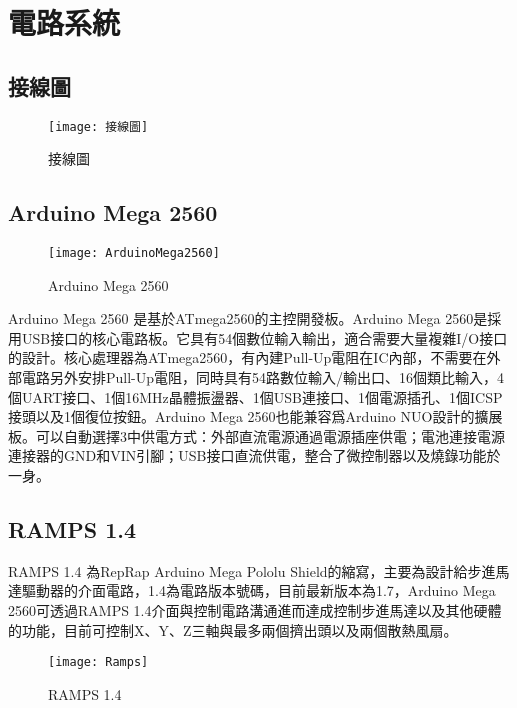 \chapter{電路系統}

\section{接線圖}

\begin{figure}[hbt!]
\begin{center}
\texttt{[image: 接線圖]}
\caption{\Large 接線圖}\label{接線圖}
\end{center}
\end{figure}

\section{Arduino Mega 2560}
\begin{figure}[hbt!]
\begin{center}
\texttt{[image: ArduinoMega2560]}
\caption{\Large Arduino Mega 2560}\label{ArduinoMega2560}
\end{center}
\end{figure}
 Arduino Mega 2560 是基於ATmega2560的主控開發板。Arduino Mega 2560是採用USB接口的核心電路板。它具有54個數位輸入輸出，適合需要大量複雜I/O接口的設計。核心處理器為ATmega2560，有內建Pull-Up電阻在IC內部，不需要在外部電路另外安排Pull-Up電阻，同時具有54路數位輸入/輸出口、16個類比輸入，4個UART接口、1個16MHz晶體振盪器、1個USB連接口、1個電源插孔、1個ICSP接頭以及1個復位按鈕。Arduino Mega 2560也能兼容爲Arduino NUO設計的擴展板。可以自動選擇3中供電方式：外部直流電源通過電源插座供電；電池連接電源連接器的GND和VIN引腳；USB接口直流供電，整合了微控制器以及燒錄功能於一身。\\[6pt]
 
\newpage 

\section{RAMPS 1.4}
 RAMPS 1.4 為RepRap Arduino Mega Pololu Shield的縮寫，主要為設計給步進馬達驅動器的介面電路，1.4為電路版本號碼，目前最新版本為1.7，Arduino Mega 2560可透過RAMPS 1.4介面與控制電路溝通進而達成控制步進馬達以及其他硬體的功能，目前可控制X、Y、Z三軸與最多兩個擠出頭以及兩個散熱風扇。\\
\begin{figure}[hbt!]
\begin{center}
\texttt{[image: Ramps]}
\caption{\Large RAMPS 1.4}\label{Ramps}
\end{center}
\end{figure}

